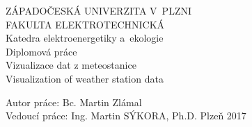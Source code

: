 \documentclass[oneside,12pt,a4paper,final]{report} %
\begin{document}
\pagestyle{empty}
\begin{titlepage}
\noindent
\begin{center}
	{\LARGE ZÁPADOČESKÁ UNIVERZITA V~PLZNI} \\[0.1cm]
	{\LARGE FAKULTA ELEKTROTECHNICKÁ} \\[0.4cm]
	{\Large\sc Katedra elektroenergetiky a~ekologie} \\
	\vspace{5cm}
	{\Huge\sc Diplomová práce} \\
	\vspace{1cm}
	{\large Vizualizace dat z meteostanice\\}
	\vspace{1cm}
	{\large Visualization of weather station data}
\end{center}
\vfill
Autor práce: Bc. Martin Zlámal\\
Vedoucí práce: Ing. Martin SÝKORA, Ph.D. \hfill Plzeň 2017
\end{titlepage}

\pagestyle{plain}








\tableofcontents
\cleardoublepage
{}
{}
\listoffigures








\end{document}
